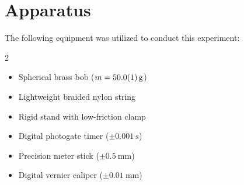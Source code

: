 \section{Apparatus}
The following equipment was utilized to conduct this experiment:
\begin{multicols}{2}
\begin{itemize}
  \item Spherical brass bob ($m = \SI{50.0 \pm 0.1}{\gram}$)
  \item Lightweight braided nylon string
  \item Rigid stand with low-friction clamp
  \item Digital photogate timer ($\pm\SI{0.001}{\second}$)
  \item Precision meter stick ($\pm\SI{0.5}{\milli\meter}$)
  \item Digital vernier caliper ($\pm\SI{0.01}{\milli\meter}$)
\end{itemize}
\end{multicols}


